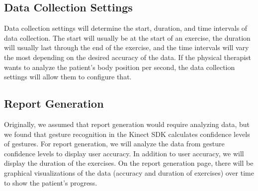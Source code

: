 \documentclass[onecolumn, draftclsnofoot,10pt, compsoc]{IEEEtran}
\begin{document}
\subsection{Data Collection Settings}
Data collection settings will determine the start, duration, and time intervals of data collection. The start will usually be at the start of an exercise, the duration will usually last through the end of the exercise, and the time intervals will vary the most depending on the desired accuracy of the data. If the physical therapist wants to analyze the patient's body position per second, the data collection settings will allow them to configure that. 

\subsection{Report Generation}
Originally, we assumed that report generation would require analyzing data, but we found that gesture recognition in the Kinect SDK calculates confidence levels of gestures. For report generation, we will analyze the data from gesture confidence levels to display user accuracy. In addition to user accuracy, we will display the duration of the exercises. On the report generation page, there will be graphical visualizations of the data (accuracy and duration of exercises) over time to show the patient's progress.
\end{document}
